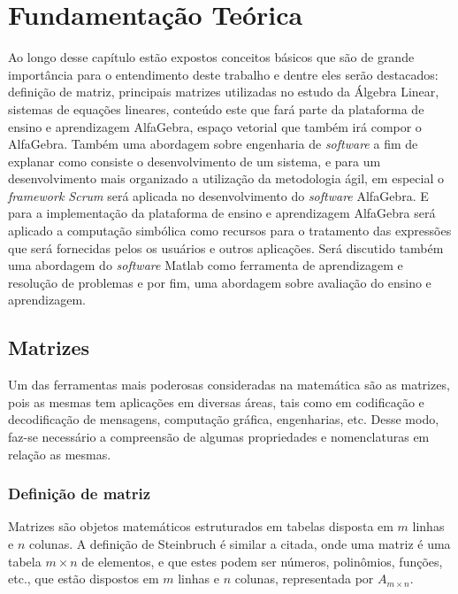 \chapter{Fundamentação Teórica}
\label{cap:teoria}

\noindent Ao longo desse capítulo estão expostos conceitos básicos que são de grande importância para o entendimento deste trabalho e dentre eles serão destacados: definição de matriz, principais matrizes utilizadas no estudo da Álgebra Linear, sistemas de equações lineares, conteúdo este que fará parte da plataforma de ensino e aprendizagem AlfaGebra, espaço vetorial que também irá compor o AlfaGebra. Também uma abordagem sobre engenharia de \textit{software} a fim de explanar como consiste o desenvolvimento de um sistema, e para um desenvolvimento mais organizado a utilização da metodologia ágil, em especial o \textit{framework Scrum} será aplicada no desenvolvimento do \textit{software} AlfaGebra. E para a implementação da plataforma de ensino e aprendizagem AlfaGebra será aplicado a computação simbólica como recursos para o tratamento das expressões que será fornecidas pelos os usuários e outros aplicações. Será discutido também uma abordagem do \textit{software} Matlab como ferramenta de aprendizagem e resolução de problemas e por fim, uma abordagem sobre avaliação do ensino e aprendizagem.

\section{Matrizes}
\noindent Um das ferramentas mais poderosas consideradas na matemática são as matrizes, pois as mesmas tem aplicações em diversas áreas, tais como em codificação e decodificação de mensagens, computação gráfica, engenharias, etc. Desse modo, faz-se necessário a compreensão de algumas propriedades e nomenclaturas em relação as mesmas.

\subsection{Definição de matriz}
\noindent Matrizes são objetos matemáticos estruturados em tabelas disposta em $m$ linhas e $n$ colunas. A definição de Steinbruch \cite{1987:Steinbruch} é similar a citada, onde uma matriz é uma tabela $m \times n$ de elementos, e que estes podem ser números, polinômios, funções, etc., que estão dispostos em $m$ linhas e $n$ colunas, representada por  $A{}_{m \times n}$.\\

